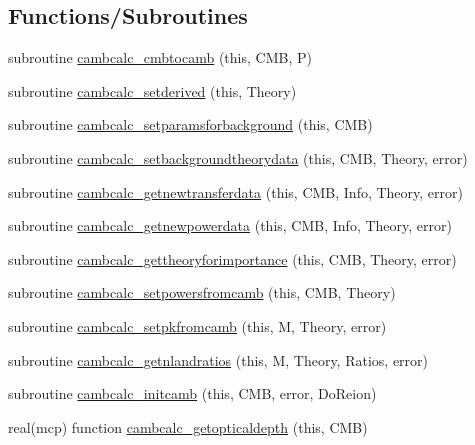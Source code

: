 \subsection*{Functions/\+Subroutines}
\begin{DoxyCompactItemize}
\item 
subroutine \mbox{\hyperlink{namespacecalculator__camb_a10914a67c9b3a93d74382c9c9adf0983}{cambcalc\+\_\+cmbtocamb}} (this, C\+MB, P)
\item 
subroutine \mbox{\hyperlink{namespacecalculator__camb_a451eeaadb06191ee0203caf0d76c66c2}{cambcalc\+\_\+setderived}} (this, Theory)
\item 
subroutine \mbox{\hyperlink{namespacecalculator__camb_a2f68d8cedf36c519d822547aa49c3f98}{cambcalc\+\_\+setparamsforbackground}} (this, C\+MB)
\item 
subroutine \mbox{\hyperlink{namespacecalculator__camb_a04c53e5b4763297e232978e627153a17}{cambcalc\+\_\+setbackgroundtheorydata}} (this, C\+MB, Theory, error)
\item 
subroutine \mbox{\hyperlink{namespacecalculator__camb_a9e8887a3ae9da2bb092aac4285234df4}{cambcalc\+\_\+getnewtransferdata}} (this, C\+MB, Info, Theory, error)
\item 
subroutine \mbox{\hyperlink{namespacecalculator__camb_ad7195d220a7f5bc77479225b47d91d17}{cambcalc\+\_\+getnewpowerdata}} (this, C\+MB, Info, Theory, error)
\item 
subroutine \mbox{\hyperlink{namespacecalculator__camb_a46bd33ed008e289fb5cb08f6feb86419}{cambcalc\+\_\+gettheoryforimportance}} (this, C\+MB, Theory, error)
\item 
subroutine \mbox{\hyperlink{namespacecalculator__camb_a7ccabec132f8bbe50ac91abdd4a86751}{cambcalc\+\_\+setpowersfromcamb}} (this, C\+MB, Theory)
\item 
subroutine \mbox{\hyperlink{namespacecalculator__camb_a8e6f706ddb3ae930a9f1293d9c480405}{cambcalc\+\_\+setpkfromcamb}} (this, M, Theory, error)
\item 
subroutine \mbox{\hyperlink{namespacecalculator__camb_ac0ce3e4748dd96f033235b9dbf3a71b3}{cambcalc\+\_\+getnlandratios}} (this, M, Theory, Ratios, error)
\item 
subroutine \mbox{\hyperlink{namespacecalculator__camb_ab67fcdadb23a73d5747a682c87304c0b}{cambcalc\+\_\+initcamb}} (this, C\+MB, error, Do\+Reion)
\item 
real(mcp) function \mbox{\hyperlink{namespacecalculator__camb_ac09824dcbd350dcc819683a630b6e646}{cambcalc\+\_\+getopticaldepth}} (this, C\+MB)
\item 

\end{DoxyCompactItemize}
